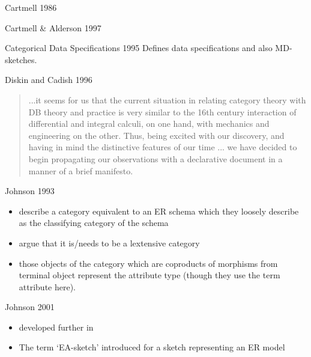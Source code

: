 \begin{frame}{Cartmell 1986}
\end{frame}

\begin{frame}{Cartmell \& Alderson 1997}
\end{frame}

\begin{frame}{Categorical Data Specifications 1995}
Defines data specifications and also MD-sketches.
\end{frame}

\begin{frame}{Diskin and Cadish 1996}
\begin{quote}
...it seems for us that
the current situation in relating category theory with DB theory and practice is very similar to the 16th
century interaction of differential and integral calculi, on one hand, with mechanics and engineering on
the other. Thus, being excited with our discovery, and having in mind the distinctive features of our time
... we have decided to begin propagating our observations with a declarative document in
a manner of a brief manifesto.
\end{quote}
\end{frame}

\begin{frame}{Johnson 1993}
\begin{itemize} \footnotesize
\item describe a category equivalent to an ER schema which they loosely describe as the classifying category of the schema
\item argue that it is/needs to be a lextensive category
\item those objects of the category which are coproducts of morphisms from terminal object represent the attribute type (though they use the term attribute here).
\end{itemize}
\end{frame}

\begin{frame}{Johnson 2001}

\begin{itemize} \footnotesize{}
\pause \item developed further in  \cite{Johnson2002ERA}
\pause \item The term `EA-sketch' introduced for a sketch representing an ER model 
\end{itemize}
\end{frame}

